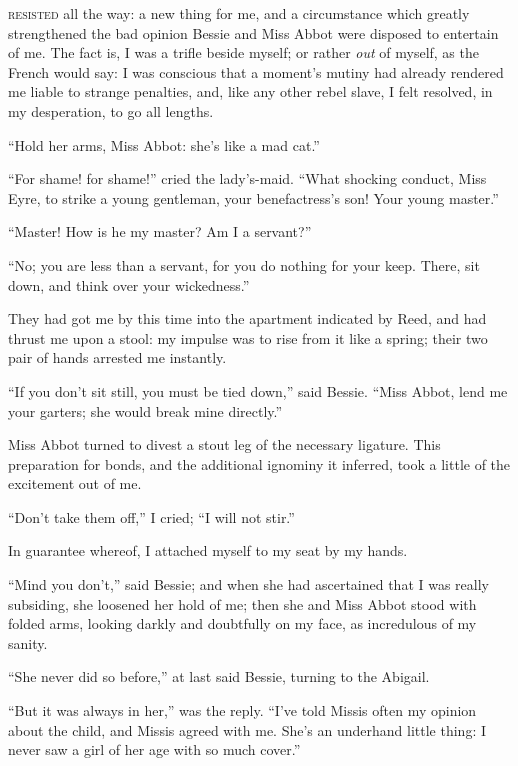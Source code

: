 
 \textsc{resisted} all the way: a new thing for me, and a circumstance which
greatly strengthened the bad opinion Bessie and Miss Abbot were disposed
to entertain of me.  The fact is, I was a trifle beside myself; or
rather \emph{out} of myself, as the French would say: I was conscious
that a moment's mutiny had already rendered me liable to strange
penalties, and, like any other rebel slave, I felt resolved, in my
desperation, to go all lengths.

\enquote{Hold her arms, Miss Abbot: she's like a mad cat.}

\enquote{For shame! for shame!} cried the lady's-maid.  \enquote{What
shocking conduct, Miss Eyre, to strike a young gentleman, your
benefactress's son!  Your young master.}

\enquote{Master!  How is he my master?  Am I a servant?}

\enquote{No; you are less than a servant, for you do nothing for your
keep.  There, sit down, and think over your wickedness.}

They had got me by this time into the apartment indicated by \Mrs{} Reed,
and had thrust me upon a stool: my impulse was to rise from it like a
spring; their two pair of hands arrested me instantly.

\enquote{If you don't sit still, you must be tied down,} said Bessie. 
\enquote{Miss Abbot, lend me your garters; she would break mine
directly.}

Miss Abbot turned to divest a stout leg of the necessary ligature.  This
preparation for bonds, and the additional ignominy it inferred, took a
little of the excitement out of me.

\enquote{Don't take them off,} I cried; \enquote{I will not stir.}

In guarantee whereof, I attached myself to my seat by my hands.

\enquote{Mind you don't,} said Bessie; and when she had ascertained that
I was really subsiding, she loosened her hold of me; then she and Miss
Abbot stood with folded arms, looking darkly and doubtfully on my face,
as incredulous of my sanity.

\enquote{She never did so before,} at last said Bessie, turning to the
Abigail.

\enquote{But it was always in her,} was the reply.  \enquote{I've told
Missis often my opinion about the child, and Missis agreed with me. 
She's an underhand little thing: I never saw a girl of her age with so
much cover.}

